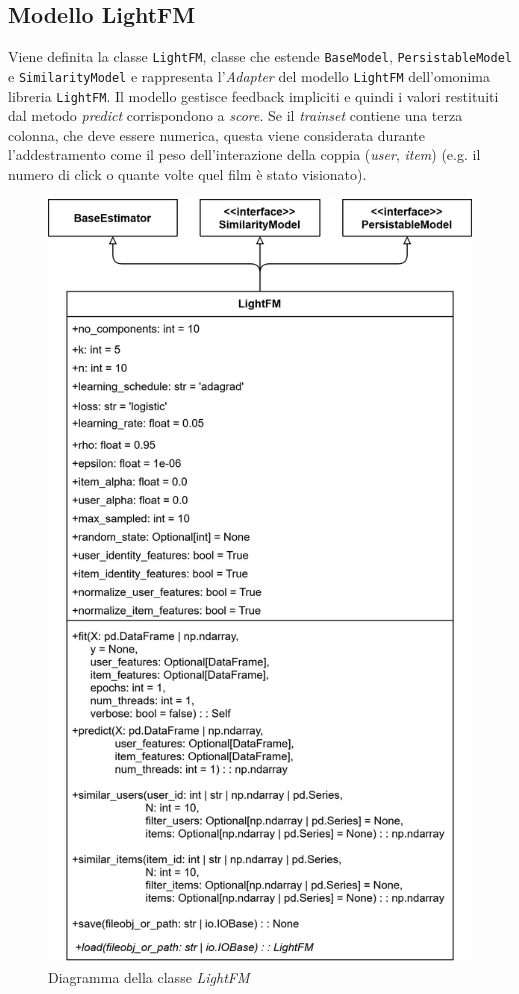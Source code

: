 \subsection{Modello LightFM}
Viene definita la classe \texttt{LightFM}, classe che estende \texttt{BaseModel}, \texttt{PersistableModel} e \texttt{SimilarityModel} e rappresenta l'\textit{Adapter} del modello \texttt{LightFM} dell'omonima libreria \texttt{LightFM}. Il modello gestisce feedback impliciti e quindi i valori restituiti dal metodo \textit{predict} corrispondono a \textit{score}. Se il \textit{trainset} contiene una terza colonna, che deve essere numerica, questa viene considerata durante l'addestramento come il peso dell'interazione della coppia (\textit{user}, \textit{item}) (e.g. il numero di click o quante volte quel film è stato visionato). 

\begin{figure}[htbp]
    \centering
    \includegraphics[scale=0.2]{figures/UML/models/light_fm.png}
    \caption{Diagramma della classe \textit{LightFM}}
\end{figure}

